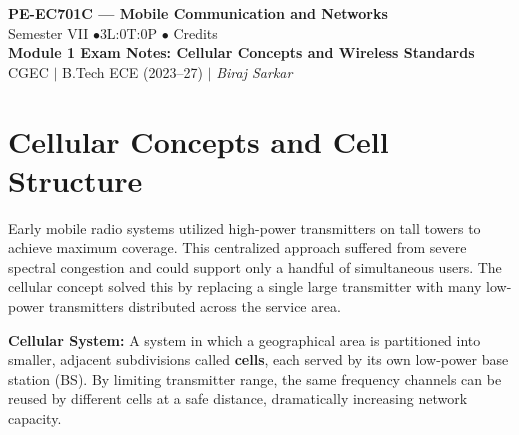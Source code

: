 \documentclass[12pt,a4paper]{article}
\begin{document}

\begin{center}
  {\LARGE\bfseries\color{myred} PE-EC701C --- Mobile Communication and Networks}\\[5pt]
  {\normalsize\color{mydark} Semester VII \quad$\bullet$\quad 3L:0T:0P \quad$\bullet$ Credits}\\[3pt]
  {\normalsize\color{myteal}\textbf{Module 1 Exam Notes: Cellular Concepts and Wireless Standards}}\\[3pt]
  {\small\color{mydark} CGEC \;$|$\; B.Tech ECE (2023--27) \;$|$\; \textit{Biraj Sarkar}}
\end{center}
\vspace{2pt}
\noindent{\color{myred}\rule{\linewidth}{1.5pt}}
\vspace{2pt}

\hypersetup{linkcolor=mydark}
\tableofcontents
\hypersetup{linkcolor=myteal}
\newpage

\section{Cellular Concepts and Cell Structure}

Early mobile radio systems utilized high-power transmitters on tall towers to achieve maximum coverage. This centralized approach suffered from severe spectral congestion and could support only a handful of simultaneous users. The cellular concept solved this by replacing a single large transmitter with many low-power transmitters distributed across the service area.

\begin{tcolorbox}[defbox]
\textbf{Cellular System:} A system in which a geographical area is partitioned into smaller, adjacent subdivisions called \textbf{cells}, each served by its own low-power base station (BS). By limiting transmitter range, the same frequency channels can be reused by different cells at a safe distance, dramatically increasing network capacity.
\end{tcolorbox}
\end{document}
